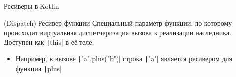 \documentclass[aspectratio=169,usenames,dvipsnames]{beamer}
\begin{document}
    \begin{frame}[fragile]{Ресиверы в Kotlin}
        \begin{block}{(Dispatch) Ресивер функции}
            Специальный параметр функции, по которому происходит виртуальная диспетчеризация вызова к реализации наследника.
            Доступен как \texttt|this| в её теле.
            \begin{itemize}
                \item Например, в вызове \texttt|"a".plus("b")| строка \texttt|"a"| является ресивером для функции \texttt|plus|
            \end{itemize}
        \end{block}
        \pause
    \end{frame}
\end{document}
